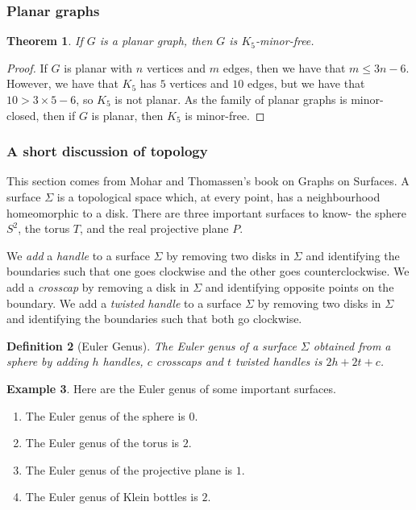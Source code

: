\documentclass[]{report}
\newtheorem{theorem}{Theorem}
\newtheorem{definition}[theorem]{Definition}
\theoremstyle{definition}
\newtheorem{example}[theorem]{Example}
\numberwithin{theorem}{section}
\numberwithin{equation}{section}
\begin{document}
\subsubsection{Planar graphs}\label{sssec:K_5-free_Planar}
\begin{theorem}\label{thm:K5_Free_Planar}
	If $G$ is a planar graph, then $G$ is $K_5$-minor-free.
\end{theorem}
\begin{proof}
	If $G$ is planar with $n$ vertices and $m$ edges, then we have that $m \leq 3n -6$. However, we have that $K_5$ has $5$ vertices and $10$ edges, but we have that $ 10 > 3 \times 5 - 6$, so $K_5$ is not planar. As the family of planar graphs is minor-closed, then if $G$ is planar, then $K_5$ is minor-free.
\end{proof}

\subsubsection{A short discussion of topology}\label{sssec:topology}
This section comes from Mohar and Thomassen's book on Graphs on Surfaces. \cite{moharGraphsSurfaces2001} A surface $\Sigma$ is a topological space which, at every point, has a neighbourhood homeomorphic to a disk. There are three important surfaces to know- the sphere $S^2$, the torus $T$, and the real projective plane $P$.
\par
We \textit{add} a \textit{handle} to a surface $\Sigma$ by removing two disks in $\Sigma$ and identifying the boundaries such that one goes clockwise and the other goes counterclockwise. We add a \textit{crosscap} by removing a disk in $\Sigma$ and identifying opposite points on the boundary. We add a \textit{twisted handle} to a surface $\Sigma$ by removing two disks in $\Sigma$ and identifying the boundaries such that both go clockwise.
\par
\begin{definition}[Euler Genus]
	The \textit{Euler genus} of a surface $\Sigma$ obtained from a sphere by adding $h$ handles, $c$ crosscaps and $t$ twisted handles is $2h + 2t + c$.
\end{definition}

\begin{example}
	Here are the Euler genus of some important surfaces.
	\begin{enumerate}
		\item The Euler genus of the sphere is $0$.
		\item The Euler genus of the torus is $2$.
		\item The Euler genus of the projective plane is $1$. 
		\item The Euler genus of Klein bottles is $2$. 
	\end{enumerate}
\end{example}
\end{document}
